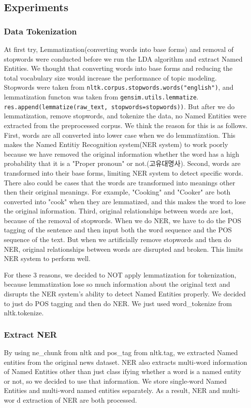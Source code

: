 \subsection{Experiments}
\subsubsection{Data Tokenization}
At first try, Lemmatization(converting words into base forms) and removal of stopwords were conducted before we run the LDA algorithm and extract Named Entities. We thought that converting words into base forms and reducing the total vocabulary size would increase the performance of topic modeling. Stopwords were taken from \texttt{nltk.corpus.stopwords.words("english")}, and lemmatization functon was taken from \texttt{gensim.utils.lemmatize}. \texttt{res.append(lemmatize(raw\_text, stopwords=stopwords))}. But after we do lemmatization, remove stopwords, and tokenize the data, no Named Entities were extracted from the preprocessed corpus. We think the reason for this is as follows. 
First, words are all converted into lower case when we do lemmatization. This makes the Named Entitiy Recognition system(NER system) to work poorly because we have removed the original information whether the word has a high probability that it is a "Proper pronoun" or not.(고유대명사).
Second, words are transformed into their base forms, limiting NER system to detect specific words. There also could be cases that the words are transformed into meanings other then their original meanings. For example, "Cooking" and "Cooker" are both converted into "cook" when they are lemmatized, and this makes the word to lose the original information.
Third, original relationships between words are lost, because of the removal of stopwords. When we do NER, we have to do the POS tagging of the sentence and then input both the word sequence and the POS sequence of the text. But when we artificially remove stopwords and then do NER, original relationships between words are disrupted and broken. This limits NER system to perform well.

For these 3 reasons, we decided to NOT apply lemmatization for tokenization, because lemmatization lose so much information about the original text and disrupts the NER system's ability to detect
 Named Entities properly. We decided to just do POS tagging and then do NER. We just used word\_tokenize from nltk.tokenize.

\subsubsection{Extract NER}
By using ne\_chunk from nltk and pos\_tag from nltk.tag, we extracted Named entities from the original news dataset. NER also extracts multi-word information of Named Entities other than just class
ifying whether a word is a named entity or not, so we decided to use that information. We store single-word Named Entities and multi-word named entities separately. As a result, NER and multi-wor
d extraction of NER are both processed.

